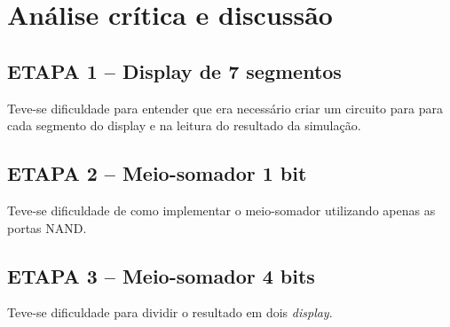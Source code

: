 \chapter{Análise crítica e discussão}
	\section{ETAPA 1 – Display de 7 segmentos}
		Teve-se dificuldade para entender que era necessário criar um circuito
		para para cada segmento do display e na leitura do resultado da simulação.
	\section{ETAPA 2 – Meio-somador 1 bit}
		Teve-se dificuldade de como implementar o meio-somador utilizando apenas as portas NAND.
	\section{ETAPA 3 – Meio-somador 4 bits}
		Teve-se dificuldade para dividir o resultado em dois \textit{display}.


